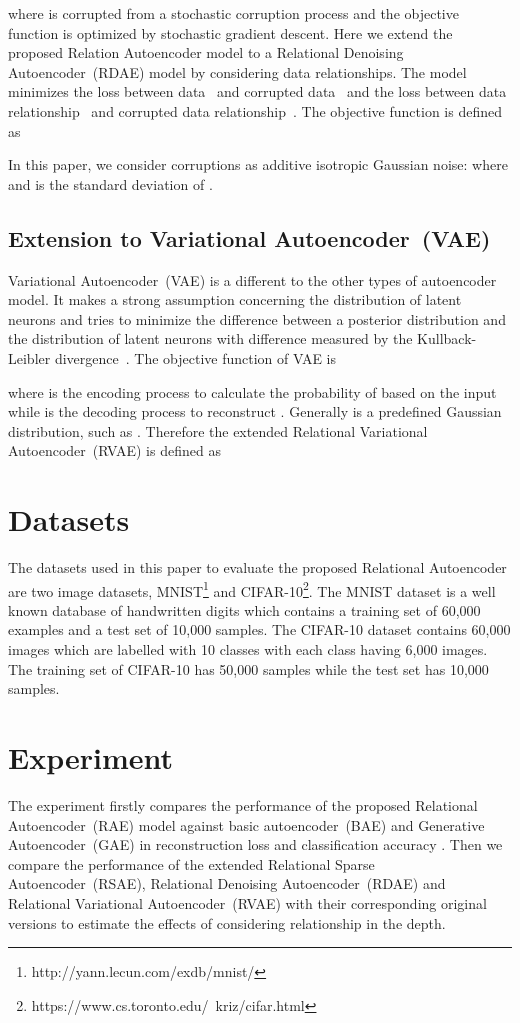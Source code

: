 \documentclass[conference]{IEEEtran}
\begin{document}
	where  is corrupted  from a stochastic corruption process  and the objective function is optimized by stochastic gradient descent. Here we extend the proposed Relation Autoencoder model to a Relational Denoising Autoencoder~(RDAE) model by considering data relationships. The model minimizes the loss between data~ and corrupted data~ and the loss between data relationship~ and corrupted data relationship~. The objective function is defined as
	
	
	In this paper, we consider corruptions as additive isotropic Gaussian noise:  where  and  is the standard deviation of .
	
	\subsection{Extension to Variational Autoencoder~(VAE)}
	Variational Autoencoder~(VAE) is a different to the other types of autoencoder model. It makes a strong assumption concerning the distribution of latent neurons and tries to minimize the difference between a posterior distribution and the distribution of latent neurons with difference measured by the Kullback-Leibler divergence~\cite{kullback1951information}. The objective function of VAE is
	
	where  is the encoding process to calculate the probability of  based on the input  while  is the decoding process to reconstruct . Generally  is a predefined Gaussian distribution, such as . Therefore the extended Relational Variational Autoencoder~(RVAE) is defined as
	
	
	\section{Datasets}  \label{sec5}
	The datasets used in this paper to evaluate the proposed Relational Autoencoder are two image datasets, MNIST\footnote{http://yann.lecun.com/exdb/mnist/} and CIFAR-10\footnote{https://www.cs.toronto.edu/~kriz/cifar.html}. The MNIST dataset is a well known database of handwritten digits which contains a training set of 60,000 examples and a test set of 10,000 samples. The CIFAR-10 dataset contains 60,000 images which are labelled with 10 classes with each class having 6,000 images. The training set of CIFAR-10 has 50,000 samples while the test set has 10,000 samples.
	
	\section{Experiment} \label{sec6}
	The experiment firstly compares the performance of the proposed Relational Autoencoder~(RAE) model against basic autoencoder~(BAE) and Generative Autoencoder~(GAE) in reconstruction loss and classification accuracy \cite{Wu:IJCNN1,Wu:TNNLS}. Then we compare the performance of the extended Relational Sparse Autoencoder~(RSAE), Relational Denoising Autoencoder~(RDAE) and Relational Variational Autoencoder~(RVAE) with their corresponding original versions to estimate the effects of considering relationship in the depth.
	
\end{document}
